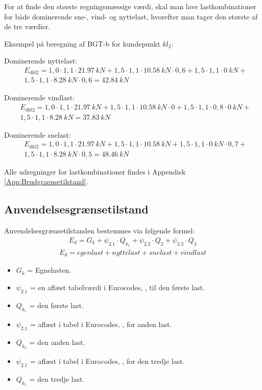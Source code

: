For at finde den største regningsmæssige værdi, skal man lave lastkombinationer for både dominerende sne-, vind- og nyttelast, hvorefter man tager den største af de tre værdier.

Eksempel på beregning af BGT-b for kundepunkt $ kl_{2} $:

Dominerende nyttelast:
\begin{align*}
& E_{dkl2} = 1,0 \cdot 1,1 \cdot \SI{21,97}{kN} + 1,5 \cdot 1,1 \cdot \SI{10,58}{kN} \cdot 0,6 + 1,5 \cdot 1,1 \cdot \SI{0}{kN} +  \\
& 1,5 \cdot 1,1 \cdot \SI{8,28}{kN} \cdot 0,6 = \SI{42,84}{kN}
\end{align*}


Dominerende vindlast:
\begin{align*}
& E_{dkl2} = 1,0 \cdot 1,1 \cdot \SI{21,97}{kN} + 1,5 \cdot 1,1 \cdot \SI{10,58}{kN} \cdot 0 + 1,5 \cdot 1,1 \cdot 0,8 \cdot \SI{0}{kN} + \\
& 1,5 \cdot 1,1 \cdot \SI{8,28}{kN}  = \SI{37,83}{kN}
\end{align*}


Dominerende snelast:
\begin{align*}
& E_{dkl2} = 1,0 \cdot 1,1 \cdot \SI{21,97}{kN} + 1,5 \cdot1,1 \cdot \SI{10,58}{kN} + 1,5 \cdot 1,1 \cdot \SI{0} {kN} \cdot 0,7 + \\
& 1,5 \cdot 1,1 \cdot \SI{8,28}{kN} \cdot 0,5 = \SI{48,46}{kN}
\end{align*}

Alle udregninger for lastkombinationer findes i Appendisk \ref{App:Brudgraensetilstand}. 

\subsection{Anvendelsesgrænsetilstand}
Anvendelsesgrænsetilstanden bestemmes via følgende formel:
\begin{align*}
E_d = G_k + \psi_{2.1} \cdot Q_{k_1} + \psi_{2.2} \cdot Q_2 + \psi_{2.3} \cdot Q_3
\end{align*}
\begin{align*}
E_d = egenlast + nyttelast + snelast + vindlast
\end{align*}
\begin{itemize}
\item $G_k$ = Egnelasten. 
\item $\psi_{2.1}$ = en aflæst tabelværdi i Eurocodes, \citep{Eurocode}, til den første last.
\item $Q_{k_1}$ = den første last. 
\item $\psi_{2.1}$ = aflæst i tabel i Eurocodes, \citep{Eurocode}, for anden last.
\item $Q_{k_1}$ = den anden last. 
\item $\psi_{2.1}$ = aflæst i tabel i Eurocodes, \citep{Eurocode}, for den tredje last.
\item $Q_{k_1}$ = den tredje last.
\end{itemize}


